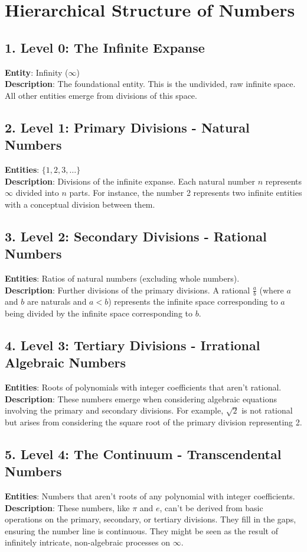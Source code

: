 \documentclass{article}
\begin{document}
\section*{Hierarchical Structure of Numbers}

\subsection*{1. Level 0: The Infinite Expanse}
\textbf{Entity}: Infinity ($\infty$) \\
\textbf{Description}: The foundational entity. This is the undivided, raw infinite space. All other entities emerge from divisions of this space.

\subsection*{2. Level 1: Primary Divisions - Natural Numbers}
\textbf{Entities}: $\{1, 2, 3, \ldots\}$ \\
\textbf{Description}: Divisions of the infinite expanse. Each natural number $n$ represents $\infty$ divided into $n$ parts. For instance, the number 2 represents two infinite entities with a conceptual division between them.

\subsection*{3. Level 2: Secondary Divisions - Rational Numbers}
\textbf{Entities}: Ratios of natural numbers (excluding whole numbers). \\
\textbf{Description}: Further divisions of the primary divisions. A rational $\frac{a}{b}$ (where $a$ and $b$ are naturals and $a < b$) represents the infinite space corresponding to $a$ being divided by the infinite space corresponding to $b$.

\subsection*{4. Level 3: Tertiary Divisions - Irrational Algebraic Numbers}
\textbf{Entities}: Roots of polynomials with integer coefficients that aren't rational. \\
\textbf{Description}: These numbers emerge when considering algebraic equations involving the primary and secondary divisions. For example, $\sqrt{2}$ is not rational but arises from considering the square root of the primary division representing 2.

\subsection*{5. Level 4: The Continuum - Transcendental Numbers}
\textbf{Entities}: Numbers that aren't roots of any polynomial with integer coefficients. \\
\textbf{Description}: These numbers, like $\pi$ and $e$, can't be derived from basic operations on the primary, secondary, or tertiary divisions. They fill in the gaps, ensuring the number line is continuous. They might be seen as the result of infinitely intricate, non-algebraic processes on $\infty$.
\end{document}
